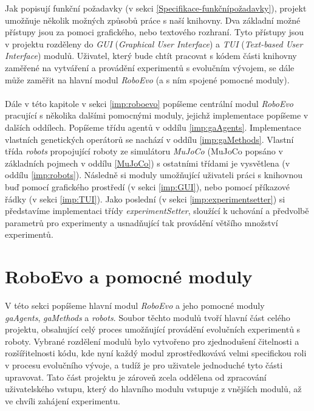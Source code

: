 Jak popisují funkční požadavky (v sekci \ref{Specifikace-funkčnípožadavky}),
projekt umožňuje několik možných způsobů práce s naší knihovny. Dva základní
možné přístupy jsou za pomoci grafického, nebo textového rozhraní. Tyto
přístupy jsou v projektu rozděleny do \emph{GUI} (\emph{Graphical User
Interface}) a \emph{TUI} (\emph{Text-based User Interface}) modulů. Uživatel,
který bude chtít pracovat s kódem části knihovny zaměřené na vytváření a
provádění experimentů s evolučním vývojem, se dále může zaměřit na hlavní modul
\emph{RoboEvo} (a s ním spojené pomocné moduly).

\paragraph{} 
Dále v této kapitole v sekci \ref{imp:roboevo} popíšeme centrální modul
\emph{RoboEvo} pracující s několika dalšími pomocnými moduly, jejichž
implementace popíšeme v dalších oddílech. Popíšeme třídu agentů v oddílu
\ref{imp:gaAgents}. Implementace vlastních genetických operátorů se nachází v
oddílu \ref{imp:gaMethods}. Vlastní třída \emph{robots} propojující roboty ze
simulátoru \emph{MuJoCo} (MuJoCo popsáno v základních pojmech v oddílu
\ref{MuJoCo}) s ostatními třídami je vysvětlena (v oddílu \ref{imp:robots}).
Následně si moduly umožňující uživateli práci s knihovnou buď pomocí grafického
prostředí (v sekci \ref{imp:GUI}), nebo pomocí příkazové řádky (v sekci
\ref{imp:TUI}). Jako poslední (v sekci \ref{imp:experimentsetter}) si
představíme implementaci třídy \emph{experimentSetter}, sloužící k uchování a
předvolbě parametrů pro experimenty a usnadňující tak provádění většího
množství experimentů.

\section{RoboEvo a pomocné moduly}
V této sekci popíšeme hlavní modul \emph{RoboEvo} a jeho pomocné moduly\\
\emph{gaAgents}, \emph{gaMethods} a \emph{robots}. Soubor těchto modulů tvoří
hlavní část celého projektu, obsahující celý proces umožňující provádění
evolučních experimentů s roboty. Vybrané rozdělení modulů bylo vytvořeno pro
zjednodušení čitelnosti a rozšířitelnosti kódu, kde nyní každý modul
zprostředkovává velmi specifickou roli v procesu evolučního vývoje, a tudíž je
pro uživatele jednoduché tyto části upravovat. Tato část projektu je zároveň
zcela oddělena od zpracování uživatelského vstupu, který do hlavního modulu
vstupuje z vnějších modulů, až ve chvíli zahájení experimentu. 

